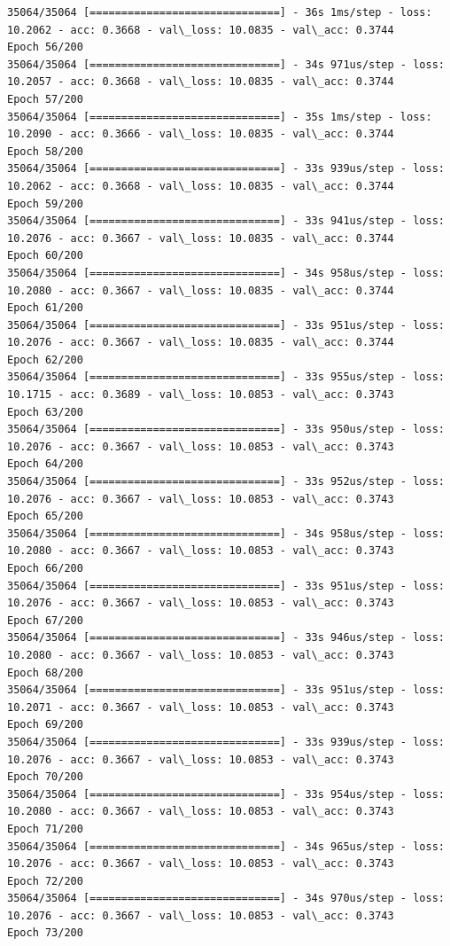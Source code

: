 \documentclass[11pt]{article}
\begin{document}
\begin{Verbatim}[commandchars=\\\{\}]
35064/35064 [==============================] - 36s 1ms/step - loss: 10.2062 - acc: 0.3668 - val\_loss: 10.0835 - val\_acc: 0.3744
Epoch 56/200
35064/35064 [==============================] - 34s 971us/step - loss: 10.2057 - acc: 0.3668 - val\_loss: 10.0835 - val\_acc: 0.3744
Epoch 57/200
35064/35064 [==============================] - 35s 1ms/step - loss: 10.2090 - acc: 0.3666 - val\_loss: 10.0835 - val\_acc: 0.3744
Epoch 58/200
35064/35064 [==============================] - 33s 939us/step - loss: 10.2062 - acc: 0.3668 - val\_loss: 10.0835 - val\_acc: 0.3744
Epoch 59/200
35064/35064 [==============================] - 33s 941us/step - loss: 10.2076 - acc: 0.3667 - val\_loss: 10.0835 - val\_acc: 0.3744
Epoch 60/200
35064/35064 [==============================] - 34s 958us/step - loss: 10.2080 - acc: 0.3667 - val\_loss: 10.0835 - val\_acc: 0.3744
Epoch 61/200
35064/35064 [==============================] - 33s 951us/step - loss: 10.2076 - acc: 0.3667 - val\_loss: 10.0835 - val\_acc: 0.3744
Epoch 62/200
35064/35064 [==============================] - 33s 955us/step - loss: 10.1715 - acc: 0.3689 - val\_loss: 10.0853 - val\_acc: 0.3743
Epoch 63/200
35064/35064 [==============================] - 33s 950us/step - loss: 10.2076 - acc: 0.3667 - val\_loss: 10.0853 - val\_acc: 0.3743
Epoch 64/200
35064/35064 [==============================] - 33s 952us/step - loss: 10.2076 - acc: 0.3667 - val\_loss: 10.0853 - val\_acc: 0.3743
Epoch 65/200
35064/35064 [==============================] - 34s 958us/step - loss: 10.2080 - acc: 0.3667 - val\_loss: 10.0853 - val\_acc: 0.3743
Epoch 66/200
35064/35064 [==============================] - 33s 951us/step - loss: 10.2076 - acc: 0.3667 - val\_loss: 10.0853 - val\_acc: 0.3743
Epoch 67/200
35064/35064 [==============================] - 33s 946us/step - loss: 10.2080 - acc: 0.3667 - val\_loss: 10.0853 - val\_acc: 0.3743
Epoch 68/200
35064/35064 [==============================] - 33s 951us/step - loss: 10.2071 - acc: 0.3667 - val\_loss: 10.0853 - val\_acc: 0.3743
Epoch 69/200
35064/35064 [==============================] - 33s 939us/step - loss: 10.2076 - acc: 0.3667 - val\_loss: 10.0853 - val\_acc: 0.3743
Epoch 70/200
35064/35064 [==============================] - 33s 954us/step - loss: 10.2080 - acc: 0.3667 - val\_loss: 10.0853 - val\_acc: 0.3743
Epoch 71/200
35064/35064 [==============================] - 34s 965us/step - loss: 10.2076 - acc: 0.3667 - val\_loss: 10.0853 - val\_acc: 0.3743
Epoch 72/200
35064/35064 [==============================] - 34s 970us/step - loss: 10.2076 - acc: 0.3667 - val\_loss: 10.0853 - val\_acc: 0.3743
Epoch 73/200

\end{Verbatim}
\end{document}
